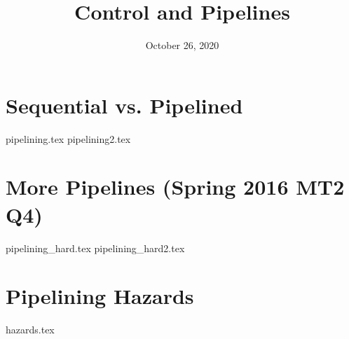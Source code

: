 \documentclass[11pt]{exam}
\title{Control and Pipelines}
\date{October 26, 2020}
\begin{document}
\maketitle

\section{Sequential vs. Pipelined}
\begin{questions}
{pipelining.tex}
{pipelining2.tex}
\end{questions}
\newpage

\section{More Pipelines (Spring 2016 MT2 Q4)}
\begin{questions}
{pipelining_hard.tex}
{pipelining_hard2.tex}
\end{questions}
\newpage

\section{Pipelining Hazards}
\begin{questions}
{hazards.tex}
\end{questions}
\end{document}
